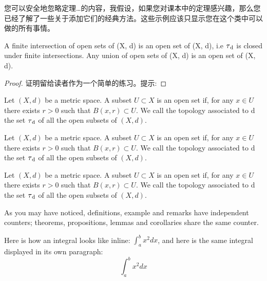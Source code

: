 您可以安全地忽略定理\ldots 的内容，我假设，如果您对课本中的定理感兴趣，那么您已经了解了一些关于添加它们的经典方法。这些示例应该只显示您在这个类中可以做的所有事情。

\begin{corollary}
A finite intersection of open sets of (X, d) is an open set of (X, d), 
i.e $\tau\textsubscript{d}$ is closed under finite intersections. Any 
union of open sets of (X, d) is an open set of (X, d).
\end{corollary}

\begin{proof}
证明留给读者作为一个简单的练习。提示: \zhlipsum[2]
\end{proof}

\begin{definition}
Let $(X, d)$ be a metric space. A subset $U \subset X$ is an open set 
if, for any $x \in U$ there exists $r > 0$ such that $B(x, r) \subset 
U$. We call the topology associated to d the set $\tau\textsubscript{d}$ 
of all the open subsets of $(X, d).$
\end{definition}


\begin{example}
Let $(X, d)$ be a metric space. A subset $U \subset X$ is an open set 
if, for any $x \in U$ there exists $r > 0$ such that $B(x, r) \subset 
U$. We call the topology associated to d the set $\tau\textsubscript{d}$ 
of all the open subsets of $(X, d).$
\end{example}

\begin{remark}
Let $(X, d)$ be a metric space. A subset $U \subset X$ is an open set 
if, for any $x \in U$ there exists $r > 0$ such that $B(x, r) \subset 
U$. We call the topology associated to d the set $\tau\textsubscript{d}$ 
of all the open subsets of $(X, d).$
\end{remark}

As you may have noticed, definitions, example and remarks have 
independent counters; theorems, propositions, lemmas and corollaries 
share the same counter.

\begin{remark}
Here is how an integral looks like inline: $\int_{a}^{b} x^2 dx$, and 
here is the same integral displayed in its own paragraph:
\[\int_{a}^{b} x^2 dx\]
\end{remark}

